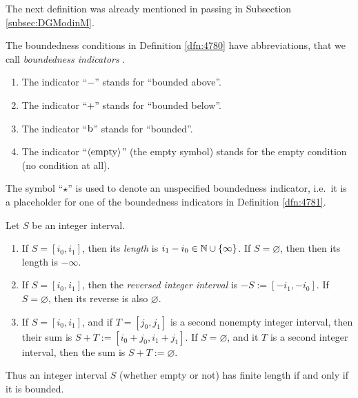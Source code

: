 The next definition was already mentioned in passing in 
Subsection \ref{subsec:DGModinM}.

\begin{dfn} \label{dfn:4781}
The boundedness conditions in Definition \ref{dfn:4780} have abbreviations, 
that we call {\em boundedness indicators}%
.
\begin{enumerate}
\item The indicator ``$-$'' stands for ``bounded above''.

\item The indicator ``$+$'' stands for ``bounded below''.

\item The indicator ``$\mathrm{b}$'' stands for ``bounded''.

\item The indicator ``$\langle \mathrm{empty} \rangle$'' (the empty symbol)
stands for the empty condition (no condition at all). 
\end{enumerate}
\end{dfn}

The symbol ``$\star$'' is used to denote an unspecified boundedness 
indicator, i.e.\ it is a placeholder for one of the boundedness indicators in 
Definition \ref{dfn:4781}.

\begin{dfn} \label{dfn:4782}
Let $S$ be an integer interval.
\begin{enumerate}
\item If $S =  [i_0, i_1]$, then its {\em length}%
is $i_1 - i_0 \in \mathbb{N} \cup \{ \infty \}$. If $S = \varnothing$, then then its 
length is $-\infty$.  

\item If $S =  [i_0, i_1]$, then the {\em reversed integer interval}%
is $-S := [-i_1, -i_0]$.
If $S = \varnothing$, then its reverse is also $\varnothing$.

\item If $S =  [i_0, i_1]$, and if $T = [j_0, j_1]$ is a second nonempty 
integer interval, then their sum%
is $S + T := [i_0 + j_0, i_1 + j_1]$.
If $S = \varnothing$, and it $T$ is a second integer interval, then the sum is
$S + T := \varnothing$. 
\end{enumerate}
\end{dfn}

Thus an integer interval $S$ (whether empty or not) has finite length if and 
only if it is bounded. 

